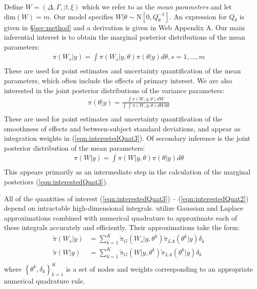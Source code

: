 \documentclass[]{article}
\begin{document}
Define $W = \left(\Delta, \Gamma,\beta, \xi \right)$ which we refer to as the \textit{mean parameters} and let $\text{dim}(W) = m$. Our model specifies $W|\theta\sim\text{N}\left[ 0,Q^{-1}_{\theta}\right]$. An expression for $Q_{\theta}$ is given in \S\ref{sec:method} and a derivation is given in Web Appendix A. Our main inferential interest is to obtain the marginal posterior distributions of the mean parameters:
\begin{equation}\begin{aligned}\label{eqn:interestedQuat3}
\pi(W_{s}|y) = \int \pi(W_{s}|y,\theta) \pi(\theta|y) d\theta, s = 1,\ldots,m  \\
\end{aligned}\end{equation}
These are used for point estimates and uncertainty quantification of the mean parameters, which often include the effects of primary interest. We are also interested in the joint posterior distributions of the variance parameters:
\begin{equation}\begin{aligned}\label{eqn:interestedQuat1}
\pi(\theta|y) = \frac{\int \pi(W,y,\theta) dW}{\int_{} \int_{} \pi(W,y,\theta) dW d\theta } \\
\end{aligned}\end{equation}
These are used for point estimates and uncertainty quantification of the smoothness of effects and between-subject standard deviations, and appear as integration weights in (\ref{eqn:interestedQuat3}). Of secondary inference is the joint posterior distribution of the mean parameters:
\begin{equation}\begin{aligned}\label{eqn:interestedQuat2}
\pi(W|y) = \int \pi(W|y,\theta) \pi(\theta|y) d\theta  \\
\end{aligned}\end{equation}
This appears primarily as an intermediate step in the calculation of the marginal posteriors (\ref{eqn:interestedQuat3}).

All of the quantities of interest (\ref{eqn:interestedQuat3}) -- (\ref{eqn:interestedQuat2}) depend on intractable high-dimensional integrals. \citet{casecross} utilize Gaussian and Laplace approximations combined with numerical quadrature to approximate each of these integrals accurately and efficiently. Their approximations take the form:
\begin{equation}\begin{aligned}\label{eqn:integration}
\tilde{\pi}(W_{s}|y) &= \sum_{k=1}^{K}
\tilde{\pi}_{G}(W_{s}|y,\theta^{k})
\tilde{\pi}_{LA}(\theta^{k}|y)\delta_{k} \\
\tilde{\pi}(W|y) &= \sum_{k=1}^{K}
\tilde{\pi}_{G}(W|y,\theta^{k})
\tilde{\pi}_{LA}(\theta^{k}|y)\delta_{k} \\
\end{aligned}\end{equation}
where $\left\{\theta^{k},\delta_{k}\right\}_{k=1}^{K}$ is a set of nodes and weights corresponding to an appropriate numerical quadrature rule.
\end{document}
